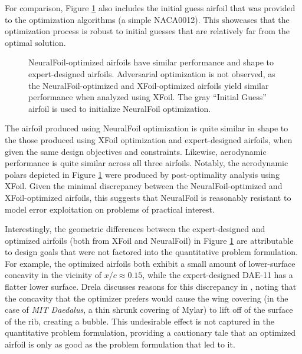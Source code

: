     For comparison, Figure \ref{fig:daedalus_optimized} also includes the initial guess airfoil that was provided to the optimization algorithms (a simple NACA0012). This showcases that the optimization process is robust to initial guesses that are relatively far from the optimal solution.

    \begin{figure}[H]
        \centering
        
        \caption{NeuralFoil-optimized airfoils have similar performance and shape to expert-designed airfoils. Adversarial optimization is not observed, as the NeuralFoil-optimized and XFoil-optimized airfoils yield similar performance when analyzed using XFoil. The gray ``Initial Guess'' airfoil is used to initialize NeuralFoil optimization.}
        \label{fig:daedalus_optimized}
    \end{figure}

    The airfoil produced using NeuralFoil optimization is quite similar in shape to the those produced using XFoil optimization and expert-designed airfoils, when given the same design objectives and constraints. Likewise, aerodynamic performance is quite similar across all three airfoils. Notably, the aerodynamic polars depicted in Figure \ref{fig:daedalus_optimized} were produced by post-optimality analysis using XFoil. Given the minimal discrepancy between the NeuralFoil-optimized and XFoil-optimized airfoils, this suggests that NeuralFoil is reasonably resistant to model error exploitation on problems of practical interest.

    Interestingly, the geometric differences between the expert-designed and optimized airfoils (both from XFoil and NeuralFoil) in Figure \ref{fig:daedalus_optimized} are attributable to design goals that were not factored into the quantitative problem formulation. For example, the optimized airfoils both exhibit a small amount of lower-surface concavity in the vicinity of $x/c \approx 0.15$, while the expert-designed DAE-11 has a flatter lower surface. Drela discusses reasons for this discrepancy in \cite{drela_pros_1998}, noting that the concavity that the optimizer prefers would cause the wing covering (in the case of \emph{MIT Daedalus}, a thin shrunk covering of Mylar) to lift off of the surface of the rib, creating a bubble. This undesirable effect is not captured in the quantitative problem formulation, providing a cautionary tale that an optimized airfoil is only as good as the problem formulation that led to it.

